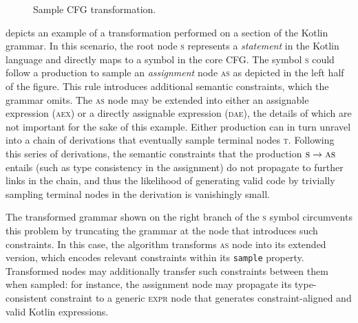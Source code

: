 \begin{figure}
    \centering
{}
 \caption{Sample \gls{CFG} transformation.}
    \label{fig:extended_cfg}
\end{figure}

 depicts an example of a transformation performed
on a section of the Kotlin grammar.
In this scenario, the root node \textsc{s} represents a \textit{statement} in the Kotlin
language and directly maps to a symbol in the core \gls{CFG}.
The symbol \textsc{s} could follow a production to sample an \textit{assignment}
node \textsc{as} as depicted in the left half of the figure.
This rule introduces additional semantic constraints, which the grammar omits.
The \textsc{as} node may be extended into either
an assignable expression (\textsc{aex}) or 
a directly assignable expression (\textsc{dae}), the details of which are
not important for the sake of this example.
Either production can in turn unravel into a chain of derivations that eventually
sample terminal nodes \textsc{t}.
Following this series of derivations, the semantic constraints that the production
$\textsc{s} \to \textsc{as}$ entails (such as type consistency in the assignment)
do not propagate to further links in the chain,
and thus the likelihood of generating
valid code by trivially sampling terminal nodes in the derivation
is vanishingly small.

The transformed grammar shown on the right branch of the \textsc{s} symbol circumvents
this problem by truncating the grammar at the node that introduces such constraints.
In this case, the algorithm transforms \textsc{as} node into its extended version,
which encodes relevant constraints within its \texttt{sample} property.
Transformed nodes may additionally transfer such constraints between them when sampled:
for instance, the assignment node may propagate its type-consistent constraint to a generic
\textsc{expr} node that generates constraint-aligned and valid Kotlin expressions.

